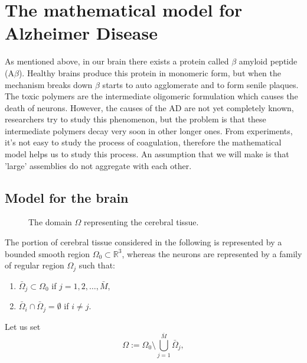 \section{The mathematical model for Alzheimer Disease}
As mentioned above, in our brain there exists a protein called \(\beta\) amyloid peptide ($\mathrm{A} \beta$). Healthy brains produce this protein in monomeric form, but when the mechanism breaks down \(\beta\) starts to auto agglomerate and to form senile plaques. The toxic polymers are the intermediate oligomeric formulation which causes the death of neurons. However, the causes of the AD are not yet completely known, researchers try to study this phenomenon, but the problem is that these intermediate polymers decay very soon in other longer ones. From experiments, it's not easy to study the process of coagulation, therefore the mathematical model helps us to study this process. An assumption that we will make is that 'large' assemblies do not aggregate with each other.
\subsection{Model for the brain}
\begin{figure}[H]
  \centering
  \caption{The domain $\Omega$ representing the cerebral tissue.}
  \label{fig:domain}
\end{figure}
The portion of cerebral tissue considered  in the following is represented by a bounded smooth region $\Omega_{0}\subset \mathbb{R}^3$, whereas the neurons are represented by a family of regular region $\Omega_{j}$ such that:
\begin{enumerate}[label=(\roman*)]
    \item $\bar\Omega_{j}\subset \Omega_{0}$  if   $j=1,2,\dots,\bar{M}$,
    \item $\bar\Omega_{i}\cap \bar\Omega_{j}= \emptyset$  if $i\neq j$.
\end{enumerate}
Let us set 
$$
\Omega := \Omega_{0} \setminus
\bigcup_{j=1}^{\bar M} \bar\Omega_{j},
$$

